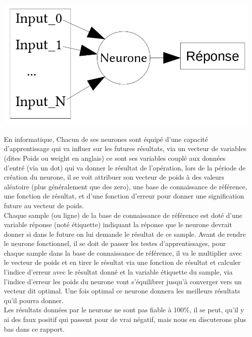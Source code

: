\begin{center}
\includegraphics[scale=0.3]{img/neurone.jpg} 
\end{center}

En informatique, Chacun de ses neurones sont équipé d'une capacité d'apprentissage qui va influer sur les futures résultats, via un vecteur de variables (dites Poids ou weight en anglais) ce sont ses variables couplé aux données d'entré (via un dot) qui va donner le résultat de l'opération, lors de la période de création du neurone, il se voit attribuer son vecteur de poids à des valeurs aléatoire (plus généralement que des zero), une base de connaissance de référence,  une fonction de résultat, et d'une fonction d'erreur pour donner une signification future au vecteur de poids.\\
\linebreak
Chaque sample (ou ligne) de la base de connaissance de référence est doté d'une variable réponse (noté étiquette) indiquant la réponse que le neurone devrait donner si dans le future on lui demande le résultat de ce sample. Avant de rendre le neurone fonctionnel, il se doit de passer les testes d'apprentissages, pour chaque sample dans la base de connaissance de référence, il va le multiplier avec le vecteur de poids et en tirer le résultat via une fonction de résultat et calculer l'indice d'erreur avec le résultat donné et la variable étiquette du sample, via l'indice d'erreur les poids du neurone vont s'équilibrer jusqu'à converger vers un vecteur dit optimal. Une fois optimal ce neurone donnera les meilleurs résultats qu'il pourra donner.\\
\linebreak
Les résultats données par le neurone ne sont pas fiable à 100\%, il se peut, qu'il y ai des faux positif qui passent pour de vrai négatif, mais nous en discuterons plus bas dans ce rapport.

\pagebreak
